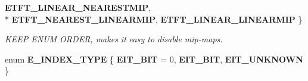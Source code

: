 \begin{DoxyCompactItemize}
{\bfseries E\+T\+F\+T\+\_\+\+L\+I\+N\+E\+A\+R\+\_\+\+N\+E\+A\+R\+E\+S\+T\+M\+IP}, 
\\*
{\bfseries E\+T\+F\+T\+\_\+\+N\+E\+A\+R\+E\+S\+T\+\_\+\+L\+I\+N\+E\+A\+R\+M\+IP}, 
{\bfseries E\+T\+F\+T\+\_\+\+L\+I\+N\+E\+A\+R\+\_\+\+L\+I\+N\+E\+A\+R\+M\+IP}
 \}\begin{DoxyCompactList}\small\item\em K\+E\+EP E\+N\+UM O\+R\+D\+ER, makes it easy to disable mip-\/maps. \end{DoxyCompactList}
\item 
enum {\bfseries E\+\_\+\+I\+N\+D\+E\+X\+\_\+\+T\+Y\+PE} \{ {\bfseries E\+I\+T\+\_\+B\+IT} = 0, 
{\bfseries E\+I\+T\+\_\+B\+IT}, 
{\bfseries E\+I\+T\+\_\+\+U\+N\+K\+N\+O\+WN}
 \}\hypertarget{namespaceirr_1_1video_af152a1edea2579f0517e0049525acb55}{}\label{namespaceirr_1_1video_af152a1edea2579f0517e0049525acb55}

\end{DoxyCompactItemize}
